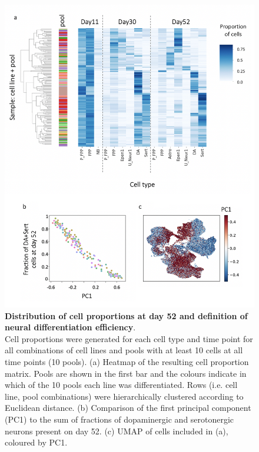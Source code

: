 \begin{figure}[htbp]
\centering
\includegraphics[width=14cm]{Chapter5/Fig/neuroseq_define_diff_efficiency.png}
\caption[Definition of neural differentiation efficiency]{\textbf{Distribution of cell proportions at day 52 and definition of neural differentiation efficiency}.\\
Cell proportions were generated for each cell type and time point for all combinations of cell lines and pools with at least 10 cells at all time points (10 pools). 
(a) Heatmap of the resulting cell proportion matrix. 
Pools are shown in the first bar and the colours indicate in which of the 10 pools each line was differentiated. 
Rows (i.e. cell line, pool combinations) were hierarchically clustered according to Euclidean distance. 
(b) Comparison of the first principal component (PC1) to the sum of fractions of dopaminergic and serotonergic neurons present on day 52.
(c) UMAP of cells included in (a), coloured by PC1.}
\label{fig:neuroseq_diff_efficiency}
\end{figure}

\clearpage

